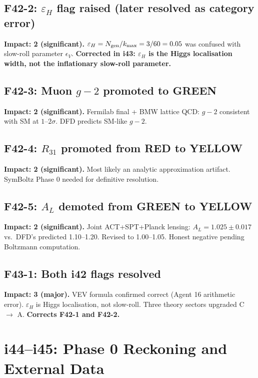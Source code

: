 \documentclass[11pt,a4paper]{article}
\begin{document}
\subsection{F42-2: $\varepsilon_H$ flag raised (later resolved as category error)}
\textbf{Impact: 2 (significant).} $\varepsilon_H = N_{\rm gen}/k_{\max} = 3/60 = 0.05$ was confused with slow-roll parameter $\epsilon_V$. \textbf{Corrected in i43: $\varepsilon_H$ is the Higgs localisation width, not the inflationary slow-roll parameter.}

\subsection{F42-3: Muon $g-2$ promoted to GREEN}
\textbf{Impact: 2 (significant).} Fermilab final + BMW lattice QCD: $g-2$ consistent with SM at $1$--$2\sigma$. DFD predicts SM-like $g-2$.

\subsection{F42-4: $R_{31}$ promoted from RED to YELLOW}
\textbf{Impact: 2 (significant).} Most likely an analytic approximation artifact. SymBoltz Phase 0 needed for definitive resolution.

\subsection{F42-5: $A_L$ demoted from GREEN to YELLOW}
\textbf{Impact: 2 (significant).} Joint ACT+SPT+Planck lensing: $A_L = 1.025 \pm 0.017$ vs.\ DFD's predicted 1.10--1.20. Revised to 1.00--1.05. Honest negative pending Boltzmann computation.

\subsection{F43-1: Both i42 flags resolved}
\textbf{Impact: 3 (major).} VEV formula confirmed correct (Agent 16 arithmetic error). $\varepsilon_H$ is Higgs localisation, not slow-roll. Three theory sectors upgraded C $\to$ A. \textbf{Corrects F42-1 and F42-2.}

\section{i44--i45: Phase 0 Reckoning and External Data}
\label{sec:i44-45}
\end{document}
